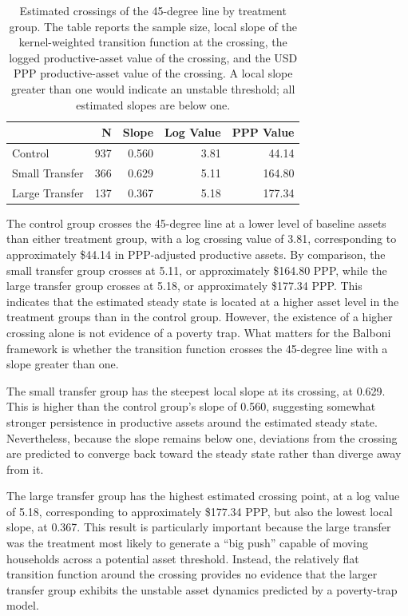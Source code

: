 \documentclass[9pt,twoside]{pnas-new}
\begin{document}
\begin{table}[ht]
\centering
\caption{Estimated crossings of the 45-degree line by treatment group. The table reports the sample size, local slope of the kernel-weighted transition function at the crossing, the logged productive-asset value of the crossing, and the USD PPP productive-asset value of the crossing. A local slope greater than one would indicate an unstable threshold; all estimated slopes are below one.}
\begin{tabular}{lrrrr}
\toprule
 &N & Slope & Log Value & PPP Value\\
\midrule
Control & 937 & 0.560 & 3.81& 44.14\\
Small Transfer& 366 & 0.629 & 5.11 & 164.80\\
Large Transfer & 137 & 0.367 & 5.18& 177.34\\
\bottomrule
\end{tabular}
\label{tab:crossings}
\end{table}

The control group crosses the 45-degree line at a lower level of baseline assets than either treatment group, with a log crossing value of 3.81, corresponding to approximately \$44.14 in PPP-adjusted productive assets. By comparison, the small transfer group crosses at 5.11, or approximately \$164.80 PPP, while the large transfer group crosses at 5.18, or approximately \$177.34 PPP. This indicates that the estimated steady state is located at a higher asset level in the treatment groups than in the control group. However, the existence of a higher crossing alone is not evidence of a poverty trap. What matters for the Balboni framework is whether the transition function crosses the 45-degree line with a slope greater than one.

The small transfer group has the steepest local slope at its crossing, at 0.629. This is higher than the control group's slope of 0.560, suggesting somewhat stronger persistence in productive assets around the estimated steady state. Nevertheless, because the slope remains below one, deviations from the crossing are predicted to converge back toward the steady state rather than diverge away from it.

The large transfer group has the highest estimated crossing point, at a log value of 5.18, corresponding to approximately \$177.34 PPP, but also the lowest local slope, at 0.367. This result is particularly important because the large transfer was the treatment most likely to generate a ``big push'' capable of moving households across a potential asset threshold. Instead, the relatively flat transition function around the crossing provides no evidence that the larger transfer group exhibits the unstable asset dynamics predicted by a poverty-trap model.
\end{document}
